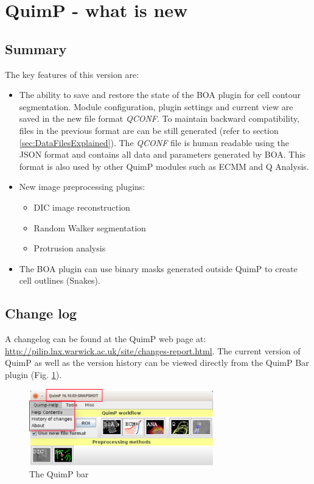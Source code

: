 \documentclass[a4paper,12pt]{article}
\begin{document}
\section{QuimP - what is new}

\subsection{Summary}
The key features of this version are:
\begin{itemize}
	\item The ability to save and restore the state of the BOA plugin for cell contour segmentation. Module configuration, plugin settings and current view are saved in the new file format \textit{QCONF}. To maintain backward compatibility, files in the previous format are can be still generated (refer to section \ref{sec:DataFilesExplained}). The \textit{QCONF} file is human readable using the JSON format and contains all data and parameters generated by BOA. This format is also used by other QuimP modules such as ECMM and Q Analysis. 
	\item New image preprocessing plugins:
	\begin{itemize}
		\item DIC image reconstruction
		\item Random Walker segmentation
		\item Protrusion analysis
	\end{itemize}   
	\item The BOA plugin can use binary masks generated outside QuimP to create cell outlines (Snakes).
\end{itemize}
	
\subsection{Change log}
A changelog can be found at the QuimP web page at: \url{http://pilip.lnx.warwick.ac.uk/site/changes-report.html}.
The current version of QuimP as well as the version history can be viewed directly from the QuimP Bar plugin (Fig. \ref{fig:quimpBar_menu}).
\begin{figure}[ht]
	\centering
	\includegraphics[width=8cm]{quimpBar_menu.png} %
	\caption{The QuimP bar}
	\label{fig:quimpBar_menu}
\end{figure}
 	
\end{document}
